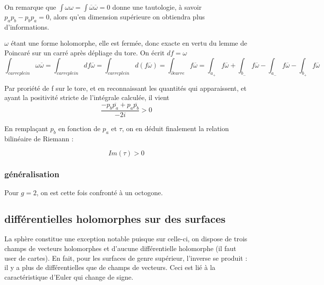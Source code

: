 \documentclass{article}
\theoremstyle{definition} %
\newcommand{\1}{\mathbb{1}} %
\begin{document}
On remarque que $\int \omega \omega = \int \overline{\omega} \overline{\omega} = 0$ donne une tautologie, à savoir $p_a p_b - p_b p_a =0$, alors qu'en dimension supérieure on obtiendra plus d'informations.

$\omega$ étant une forme holomorphe, elle est fermée, donc exacte en vertu du lemme de Poincaré sur un carré après dépliage du tore.
On écrit $df=\omega$
$$\int_{carre plein} \omega \overline{\omega} = \int_{carre plein} df \overline{\omega} = \int_{carre plein} d(f \overline{\omega}) = \int_{\partial carre} f \overline{\omega}= \int_{a_+} f \overline{\omega} + \int_{b_-} f \overline{\omega} - \int_{a_-} f \overline{\omega} - \int_{b_+} f \overline{\omega}$$

Par proriété de f sur le tore, et en reconnaissant les quantités qui apparaissent, et ayant la positivité stricte de l'intégrale calculée, il vient 
$$\frac{-p_b \overline{p_a} + p_a \overline{p_b} }{-2i} >0$$

En remplaçant $p_b$ en fonction de $p_a$ et $\tau $, on en déduit finalement la relation bilinéaire de Riemann :

\begin{tcolorbox}[colback=blue!5!white,colframe=blue!75!black,title=Inégalité de Riemann]
$$Im(\tau) > 0$$
\end{tcolorbox}





\subsubsection{généralisation}

Pour $g=2$, on est cette fois confronté à un octogone. 




\subsection{différentielles holomorphes sur des surfaces}

\begin{tcolorbox}[colback=blue!5!white,colframe=blue!75!black,title=Principe]
    La sphère constitue une exception notable puisque sur celle-ci, on dispose de trois champs de vecteurs holomorphes et d'aucune différentielle holomorphe (il faut user de cartes).
    En fait, pour les surfaces de genre supérieur, l'inverse se produit : il y a plus de différentielles que de champs de vecteurs.
    Ceci est lié à la caractéristique d'Euler qui change de signe.
\end{tcolorbox}
\end{document}
